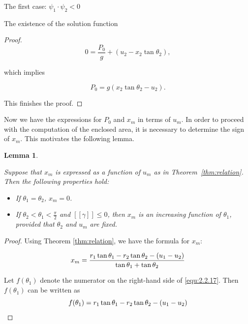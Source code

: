 \documentclass[letterpaper,reqno,10pt,twoside]{amsart}
\newtheorem{lemma}[theorem]{Lemma}
\theoremstyle{definition}
\theoremstyle{remark}
\begin{document}
\begin{section}{The first case: $\psi_1\cdot \psi_2<0$ }
\begin{subsection}{The existence of the solution function}
\begin{proof}
        \begin{equation*}
            0=\frac{P_{0}}{g}+(u_2-x_2\tan\theta_2),
        \end{equation*}

        \noindent which implies

        \begin{equation*}
            P_{0}=g(x_2\tan\theta_2-u_2).
        \end{equation*}

        \noindent This finishes the proof.
    \end{proof}
    
    Now we have the expressions for $P_{0}$ and $x_m$ in terms of $u_{m}$. In order to proceed with the computation of the enclosed area, it is necessary to determine the sign of $x_{m}$. This motivates the following lemma.

    \begin{lemma}{\label{lem:pos}}

    Suppose that $x_{m}$ is expressed as a function of $u_{m}$ as in Theorem~\ref{thm:relation}. Then the following properties hold:

    \begin{itemize}
    \item If $\theta_1=\theta_2$, $x_{m}=0$.
    \item   If $\theta_{2}<\theta_{1}<\frac{\pi}{2}$ and $[\![\gamma]\!]\le 0$, then $x_{m}$ is an increasing function of $\theta_{1}$, provided that $\theta_{2}$ and $u_{m}$ are fixed.
    \end{itemize}
    \end{lemma}

    \begin{proof}

     Using Theorem \ref{thm:relation}, we have the formula for $x_{m}$:

    \begin{equation}{\label{equ:2.2.17}}
            x_{m}=\frac{r_1\tan\theta_{1}-r_{2}\tan\theta_{2}-(u_1-u_2)}{\tan\theta_{1}+\tan\theta_{2}}
    \end{equation}

    Let $f(\theta_{1})$ denote the numerator on the right-hand side of \eqref{equ:2.2.17}. Then $f(\theta_{1})$ can be written as
    \begin{equation}{\label{equ:2.2.110}}
        f(\theta_1)=r_1\tan\theta_{1}-r_{2}\tan\theta_{2}-(u_1-u_2)
    \end{equation}
    

\end{proof}
\end{subsection}
\end{section}
\end{document}
